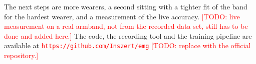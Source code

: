 \documentclass[conference]{IEEEtran}
\begin{document}
The next steps are more wearers, a second sitting with a tighter fit of the band for
the hardest wearer, and a measurement of the live accuracy.
\textcolor{red}{[TODO: live measurement on a real armband, not from the recorded data
set, still has to be done and added here.]}
The code, the recording tool and the training pipeline are available at
\textcolor{red}{\texttt{https://github.com/Inszert/emg}}
\textcolor{red}{[TODO: replace with the official repository.]}

\printbibliography
\end{document}
